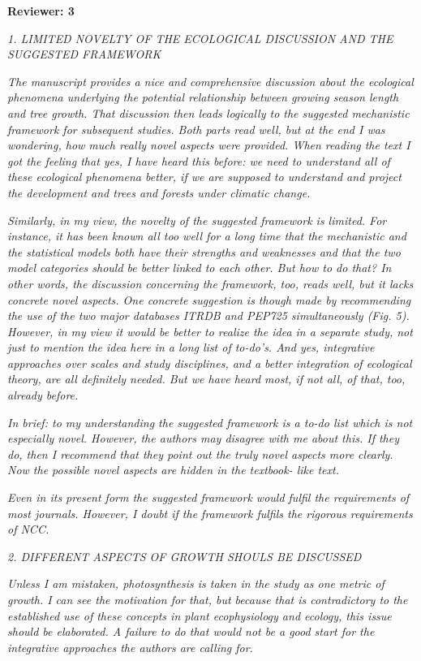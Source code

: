 \documentclass[11pt]{article}
\begin{document}
{\bf Reviewer: 3}

\emph{1. LIMITED NOVELTY OF THE ECOLOGICAL DISCUSSION AND THE SUGGESTED FRAMEWORK}


\emph{The manuscript provides a nice and comprehensive discussion about the ecological phenomena underlying the potential relationship between growing season length and tree growth. That discussion then leads logically to the suggested mechanistic framework for subsequent studies. Both parts read well, but at the end I was wondering, how much really novel aspects were provided. When reading the text I got the feeling that yes, I have heard this before: we need to understand all of these ecological phenomena better, if we are supposed to understand and project the development and trees and forests under climatic change.}


\emph{Similarly, in my view, the novelty of the suggested framework is limited. For instance, it has been known all too well for a long time that the mechanistic and the statistical models both have their strengths and weaknesses and that the two model categories should be better linked to each other. But how to do that? In other words, the discussion concerning the framework, too, reads well, but it lacks concrete novel aspects. One concrete suggestion is though made by recommending the use of the two major databases ITRDB and PEP725 simultaneously (Fig. 5). However, in my view it would be better to realize the idea in a separate study, not just to mention the idea here in a long list of to-do’s. And yes, integrative approaches over scales and study disciplines, and a better integration of ecological theory, are all definitely needed. But we have heard most, if not all, of that, too, already before.}


\emph{In brief: to my understanding the suggested framework is a to-do list which is not especially novel. However, the authors may disagree with me about this. If they do, then I recommend that they point out the truly novel aspects more clearly. Now the possible novel aspects are hidden in the textbook- like text.}


\emph{Even in its present form the suggested framework would fulfil the requirements of most journals. However, I doubt if the framework fulfils the rigorous requirements of NCC.}


\emph{2. DIFFERENT ASPECTS OF GROWTH SHOULS BE DISCUSSED}

\emph{Unless I am mistaken, photosynthesis is taken in the study as one metric of growth. I can see the motivation for that, but because that is contradictory to the established use of these concepts in plant ecophysiology and ecology, this issue should be elaborated. A failure to do that would not be a good start for the integrative approaches the authors are calling for.}
\end{document}
